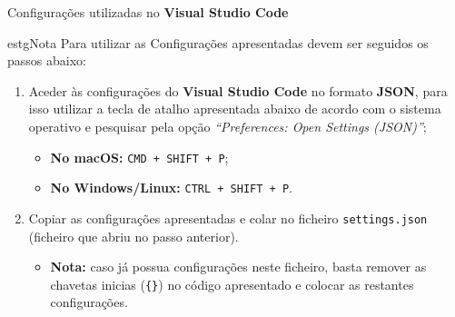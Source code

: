 \label{vscodeConfigs}

\begin{longlisting}
	\inputminted{json}{code/vscode-settings.json}
	\caption{Configurações utilizadas no \textbf{Visual Studio Code}}
\end{longlisting}

\begin{mybox}{estg}{Nota}
	Para utilizar as Configurações apresentadas devem ser seguidos os passos abaixo:

	\begin{enumerate}
		\item Aceder às configurações do \textbf{Visual Studio Code} no formato \textbf{JSON}, para isso utilizar a tecla de atalho apresentada abaixo de acordo com o sistema operativo e pesquisar pela opção \textit{``Preferences: Open Settings (JSON)''};
		\begin{itemize}
			\item \textbf{No macOS:} \texttt{CMD + SHIFT + P};
			\item \textbf{No Windows/Linux:} \texttt{CTRL + SHIFT + P}.
		\end{itemize}
		\item Copiar as configurações apresentadas e colar no ficheiro \texttt{settings.json} (ficheiro que abriu no passo anterior).
		\begin{itemize}
			\item \textbf{Nota:} caso já possua configurações neste ficheiro, basta remover as chavetas inicias (\verb|{}|) no código apresentado e colocar as restantes configurações.
		\end{itemize}
	\end{enumerate}
\end{mybox}